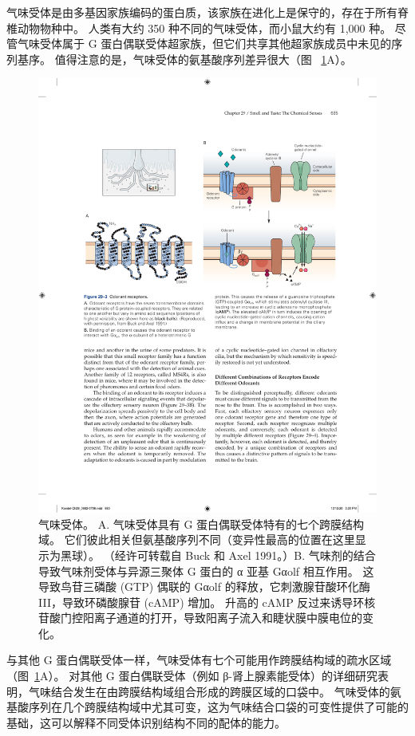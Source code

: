气味受体是由多基因家族编码的蛋白质，该家族在进化上是保守的，存在于所有脊椎动物物种中。
人类有大约 350 种不同的气味受体，而小鼠大约有 1,000 种。 
尽管气味受体属于 G 蛋白偶联受体超家族，但它们共享其他超家族成员中未见的序列基序。 
值得注意的是，气味受体的氨基酸序列差异很大（图 ~\ref{fig:29_3}A）。


\begin{figure}[htbp]
	\centering
	\includegraphics[width=0.95\linewidth]{chap29/fig_29_3}
	\caption{气味受体。 A. 气味受体具有 G 蛋白偶联受体特有的七个跨膜结构域。 它们彼此相关但氨基酸序列不同（变异性最高的位置在这里显示为黑球）。 （经许可转载自 Buck 和 Axel 1991。）B. 气味剂的结合导致气味剂受体与异源三聚体 G 蛋白的 α 亚基 Gαolf 相互作用。 这导致鸟苷三磷酸 (GTP) 偶联的 Gαolf 的释放，它刺激腺苷酸环化酶 III，导致环磷酸腺苷 (cAMP) 增加。 升高的 cAMP 反过来诱导环核苷酸门控阳离子通道的打开，导致阳离子流入和睫状膜中膜电位的变化。}
	\label{fig:29_3}
\end{figure}


与其他 G 蛋白偶联受体一样，气味受体有七个可能用作跨膜结构域的疏水区域（图~\ref{fig:29_3}A）。
对其他 G 蛋白偶联受体（例如 β-肾上腺素能受体）的详细研究表明，气味结合发生在由跨膜结构域组合形成的跨膜区域的口袋中。 
气味受体的氨基酸序列在几个跨膜结构域中尤其可变，这为气味结合口袋的可变性提供了可能的基础，这可以解释不同受体识别结构不同的配体的能力。


